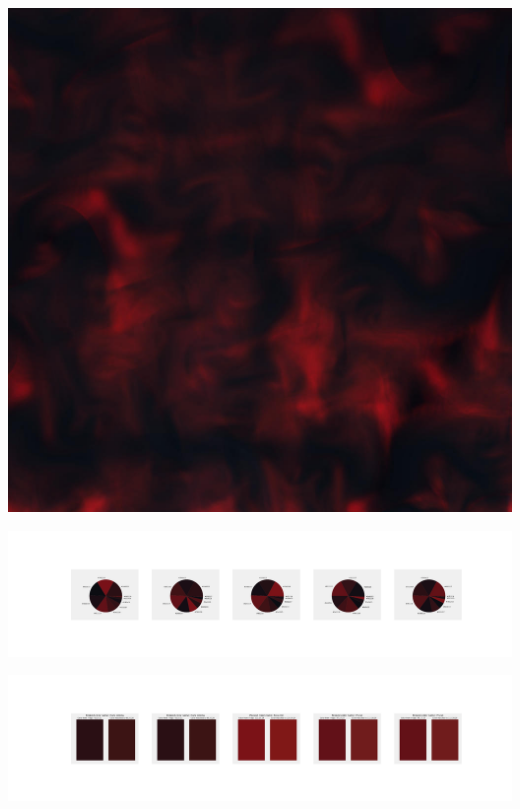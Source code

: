 \documentclass[11pt]{article}
\begin{document}
\begin{landscape}
    \begin{center}
    \includegraphics[width=\textwidth]{./nbimg/file (381).jpg}
    \end{center}

    \begin{center}
    \includegraphics[width=250mm]{./nbimg/pie-313.jpg}
    \end{center}

    \begin{center}
    \includegraphics[width=250mm]{./nbimg/peak-313.jpg}
    \end{center}
    


\end{landscape}
\end{document}

